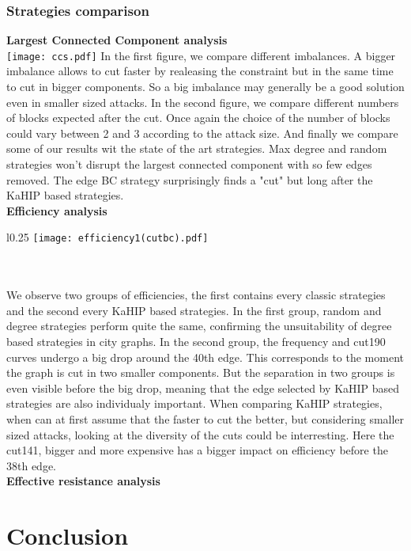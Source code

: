 \documentclass{article}
\begin{document}
\subsubsection{Strategies comparison}
\textbf{Largest Connected Component analysis}\\
\texttt{[image: ccs.pdf]}
In the first figure, we compare different imbalances. A bigger imbalance allows to cut faster by realeasing the constraint but in the same time to cut in bigger components. So a big imbalance may generally be a good solution even in smaller sized attacks. In the second figure, we compare different numbers of blocks expected after the cut. Once again the choice of the number of blocks could vary between 2 and 3 according to the attack size. And finally we compare some of our results wit the state of the art strategies. Max degree and random strategies won't disrupt the largest connected component with so few edges removed. The edge BC strategy surprisingly finds a "cut" but long after the KaHIP based strategies.
\vspace{10pt}\\
\textbf{Efficiency analysis}\\
\begin{wrapfigure}[19]{l}{0.25\textwidth}
    \texttt{[image: efficiency1(cutbc).pdf]}
\end{wrapfigure}\\
\vspace{10pt}\\
We observe two groups of efficiencies, the first contains every classic strategies and the second every KaHIP based strategies. In the first group, random and degree strategies perform quite the same, confirming the unsuitability of degree based strategies in city graphs. In the second group, the frequency and cut190 curves undergo a big drop around the 40th edge. This corresponds to the moment the graph is cut in two smaller components. But the separation in two groups is even visible before the big drop, meaning that the edge selected by KaHIP based strategies are also individualy important. When comparing KaHIP strategies, when can at first assume that the faster to cut the better, but considering smaller sized attacks, looking at the diversity of the cuts could be interresting. Here the cut141, bigger and more expensive has a bigger impact on efficiency before the 38th edge.\\
\textbf{Effective resistance analysis}

\section{Conclusion}
\end{document}
